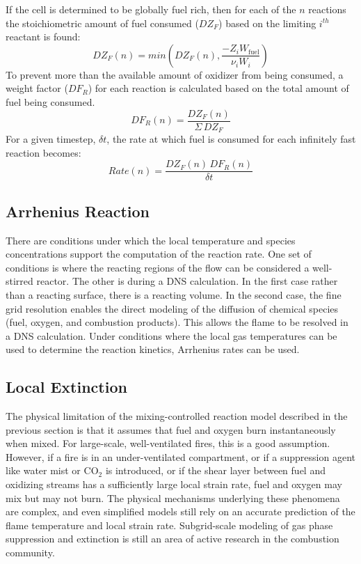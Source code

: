If the cell is determined to be globally fuel rich, then for each of the $n$ reactions the stoichiometric amount of fuel consumed ($DZ_F$) based on the limiting $i^{th}$ reactant is found:
\begin{equation}\label{eq:stoich_fuel}
DZ_F(n) = min\left (DZ_F(n),\frac{-Z_{i}W_{\mathrm{fuel}}}{\nu_{i}W_{i}}\right)
\end{equation}
To prevent more than the available amount of oxidizer from being consumed, a weight factor ($DF_{R}$) for each reaction is calculated based on the total amount of fuel being consumed.
\begin{equation}\label{eq:fuel_weight}
DF_R(n) = \frac{DZ_F(n)}{\Sigma \, DZ_F}
\end{equation}
For a given timestep, $\delta t$, the rate at which fuel is consumed for each infinitely fast reaction becomes:
\begin{equation}\label{eq:fuel_rate}
Rate(n) = \frac{DZ_F(n)\,DF_R(n)}{\delta t}
\end{equation}

\subsection{Arrhenius Reaction}
There are conditions under which the local temperature and species concentrations support the computation of the reaction rate.  One set of conditions is where the reacting regions of the flow can be considered a well-stirred reactor.  The other is during a DNS calculation.  In the first case rather than a reacting surface, there is a reacting volume.  In the second case, the fine grid resolution enables the direct modeling of the diffusion of chemical species (fuel,
oxygen, and combustion products).  This allows the flame to be resolved in a DNS calculation.  Under conditions where the local gas
temperatures can be used to determine the reaction kinetics, Arrhenius rates can be used.


\subsection{Local Extinction}

\label{extinction}

The physical limitation of the mixing-controlled reaction model described in the previous section is that it assumes that fuel and oxygen burn instantaneously when mixed. For large-scale, well-ventilated
fires, this is a good assumption. However, if a fire is in an
under-ventilated compartment, or if a suppression agent like water
mist or CO$_2$ is introduced, or if the shear layer between fuel and oxidizing streams
has a sufficiently large local strain rate,
fuel and oxygen may mix but may not burn.
The physical mechanisms underlying these phenomena are complex, and
even simplified models still rely on an accurate prediction
of the flame temperature and local strain rate.
Subgrid-scale modeling of gas phase suppression and
extinction is still an area of active research in the combustion
community.

